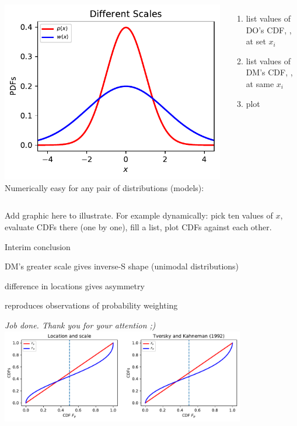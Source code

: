\begin{frame}
\begin{columns}[T]
\centering
	\includegraphics[width=1.1\textwidth]{../../figs/2GaussianPDFs2Scales.pdf}
Numerically easy for any pair of distributions (models):
\begin{enumerate}
	\item list values of DO's CDF, , at set ${x_i}$
	\item list values of DM's CDF, , at same ${x_i}$
	\item plot  \vs {}
\end{enumerate}
\end{columns}

Add graphic here to illustrate. For example dynamically: pick ten values of $x$, evaluate CDFs there (one by one), fill a list, plot CDFs against each other.
\end{frame}

\begin{frame}{Interim conclusion}
\bi
	\item DM's greater scale gives inverse-S shape (unimodal distributions)
	\item difference in locations gives asymmetry
	\item reproduces observations of probability weighting
	\item[]
	\item[] \textit{Job done. Thank you for your attention ;)}
	\hfill
	\hyperlink{FunctionalForms}{}
	\label{InterimConclusion}
\ei
	\vspace{2em}
	\centering
	\includegraphics[width=0.8\textwidth]{../../figs/Our_result_LocScale_vs_KT.pdf}
\end{frame}

